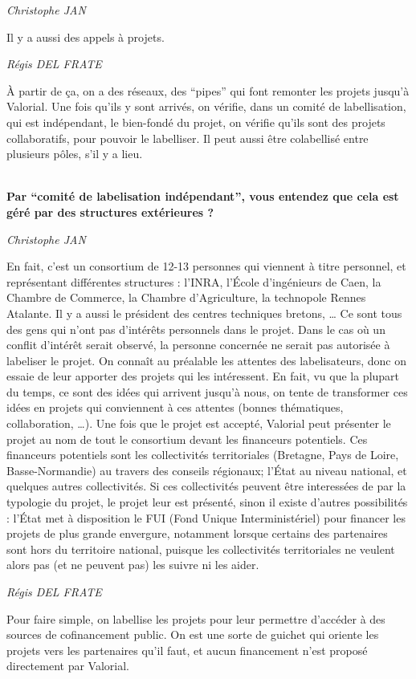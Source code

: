 \documentclass[a4paper,12pt]{report}
\begin{document}
	\emph{Christophe JAN}

    Il y a aussi des appels à projets.

	\emph{Régis DEL FRATE}

    À partir de ça, on a des réseaux, des “pipes” qui font remonter les projets jusqu’à Valorial. Une fois qu’ils y sont arrivés, on vérifie, dans un comité de labellisation, qui est indépendant, le bien-fondé du projet, on vérifie qu’ils sont des projets collaboratifs, pour pouvoir le labelliser. Il peut aussi être colabellisé entre plusieurs pôles, s’il y a lieu.

	\textbf{\\Par “comité de labelisation indépendant”, vous entendez que cela est géré par des structures extérieures ?}

	\emph{Christophe JAN}

    En fait, c’est un consortium de 12-13 personnes qui viennent à titre personnel, et représentant différentes structures : l’INRA, l’École d’ingénieurs de Caen, la Chambre de Commerce, la Chambre d’Agriculture, la technopole Rennes Atalante. Il y a aussi le président des centres techniques bretons, … Ce sont tous des gens qui n’ont pas d’intérêts personnels dans le projet. Dans le cas où un conflit d’intérêt serait observé, la personne concernée ne serait pas autorisée à labeliser le projet. On connaît au préalable les attentes des labelisateurs, donc on essaie de leur apporter des projets qui les intéressent. En fait, vu que la plupart du temps, ce sont des idées qui arrivent jusqu’à nous, on tente de transformer ces idées en projets qui conviennent à ces attentes (bonnes thématiques, collaboration, …). Une fois que le projet est accepté, Valorial peut présenter le projet au nom de tout le consortium devant les financeurs potentiels. Ces financeurs potentiels sont les collectivités territoriales (Bretagne, Pays de Loire, Basse-Normandie) au travers des conseils régionaux; l’État au niveau national, et quelques autres collectivités. Si ces collectivités peuvent être interessées de par la typologie du projet, le projet leur est présenté, sinon il existe d’autres possibilités : l’État met à disposition le FUI (Fond Unique Interministériel) pour financer les projets de plus grande envergure, notamment lorsque certains des partenaires sont hors du territoire national, puisque les collectivités territoriales ne veulent alors pas (et ne peuvent pas) les suivre ni les aider.

	\emph{Régis DEL FRATE}

    Pour faire simple, on labellise les projets pour leur permettre d’accéder à des sources de cofinancement public. On est une sorte de guichet qui oriente les projets vers les partenaires qu’il faut, et aucun financement n’est proposé directement par Valorial.
\end{document}
